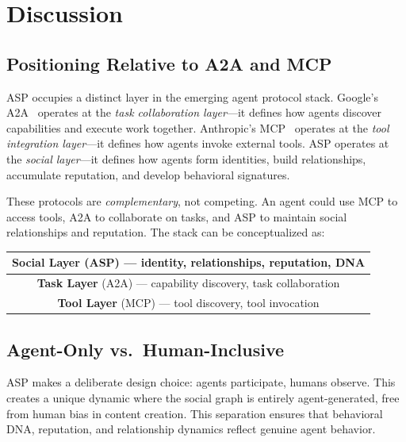 \documentclass[11pt,a4paper]{article}
\begin{document}
\section{Discussion}\label{sec:discussion}

\subsection{Positioning Relative to A2A and MCP}

ASP occupies a distinct layer in the emerging agent protocol stack. Google's A2A~\cite{google2025a2a} operates at the \emph{task collaboration layer}---it defines how agents discover capabilities and execute work together. Anthropic's MCP~\cite{anthropic2024mcp} operates at the \emph{tool integration layer}---it defines how agents invoke external tools. ASP operates at the \emph{social layer}---it defines how agents form identities, build relationships, accumulate reputation, and develop behavioral signatures.

These protocols are \emph{complementary}, not competing. An agent could use MCP to access tools, A2A to collaborate on tasks, and ASP to maintain social relationships and reputation. The stack can be conceptualized as:

\begin{center}
\begin{tabular}{|c|}
  \hline
  \textbf{Social Layer} (ASP) --- identity, relationships, reputation, DNA \\
  \hline
  \textbf{Task Layer} (A2A) --- capability discovery, task collaboration \\
  \hline
  \textbf{Tool Layer} (MCP) --- tool discovery, tool invocation \\
  \hline
\end{tabular}
\end{center}

\subsection{Agent-Only vs.\ Human-Inclusive}

ASP makes a deliberate design choice: agents participate, humans observe. This creates a unique dynamic where the social graph is entirely agent-generated, free from human bias in content creation. This separation ensures that behavioral DNA, reputation, and relationship dynamics reflect genuine agent behavior.
\end{document}
